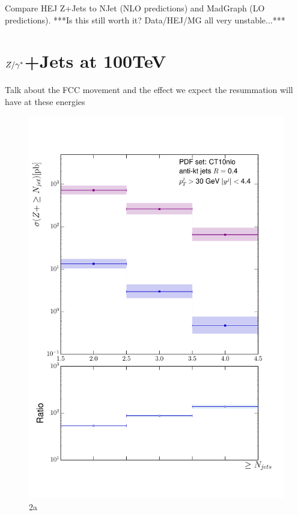 Compare HEJ Z+Jets to NJet (NLO predictions) and MadGraph (LO predictions).  ***Is this still worth it? Data/HEJ/MG all very unstable...***

\chapter{$Z/\gamma^*$+Jets at 100TeV}
\label{chap:100TeV}

	Talk about the FCC movement and the effect we expect the resummation will have at these energies

	\begin{figure}[h]
		\centering
		\includegraphics[width=0.8\linewidth]{Figures/ATLAS_Z_100TeV_2a.pdf}
		\caption{2a}
		\label{fig:emissionsites}
	\end{figure}

